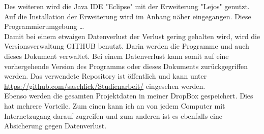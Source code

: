 Des weiteren wird die Java  IDE "Eclipse" mit der Erweiterung "Lejos" genutzt. Auf die Installation der Erweiterung wird im Anhang näher eingegangen. Diese Programmierumgebung \dots \\

Damit bei einem etwaigen Datenverlust der Verlust gering gehalten wird, wird die Versionsverwaltung GITHUB benutzt. Darin werden die Programme und auch dieses Dokument verwaltet. Bei einem Datenverlust kann somit auf eine vorhergehende  Version des Programms oder dieses Dokuments zurückgegriffen werden. Das verwendete Repository ist öffentlich und kann unter \url{https://github.com/saschlick/Studienarbeit/} eingesehen werden.\\Ebenso werden die gesamten Projektdaten in meiner DropBox gespeichert. Dies hat mehrere Vorteile. Zum einen kann ich an von jedem Computer mit Internetzugang darauf zugreifen und zum anderen ist es ebenfalls eine Absicherung gegen Datenverlust.     








